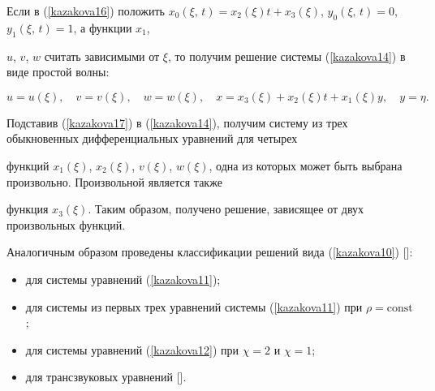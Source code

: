 Если в (\ref{kazakova16}) положить  $x_0(\xi,\,t)=x_2(\xi)t+x_3(\xi)$,  $y_0(\xi,\,t)=0$,  $y_1(\xi,\,t)=1$, а функции  $x_1$,

$u$, $v$, $w$  считать зависимыми от  $\xi$, то получим решение системы (\ref{kazakova14}) в виде простой волны:

\begin{equation}\label{kazakova17}

u=u(\xi), \quad v=v(\xi), \quad w=w(\xi), \quad

x=x_3(\xi)+x_2(\xi)t+x_1(\xi)y,\quad y=\eta.

\end{equation}

Подставив (\ref{kazakova17}) в (\ref{kazakova14}), получим систему из трех обыкновенных дифференциальных уравнений для четырех

функций $x_1(\xi)$, $x_2(\xi)$, $v(\xi)$, $w(\xi)$, одна из которых может быть выбрана произвольно. Произвольной является также

функция  $x_3(\xi)$. Таким образом, получено решение, зависящее от двух произвольных функций.



Аналогичным образом проведены классификации решений вида (\ref{kazakova10}) []:



\begin{itemize}

\item[a)] для системы уравнений (\ref{kazakova11});



\item[б)] для системы из первых трех уравнений системы (\ref{kazakova11}) при  $\rho=\text{const}$;



\item[в)] для системы уравнений (\ref{kazakova12}) при $\chi=2$ и $\chi=1$;



\item[г)] для трансзвуковых уравнений [].

\end{itemize}



\smallskip




